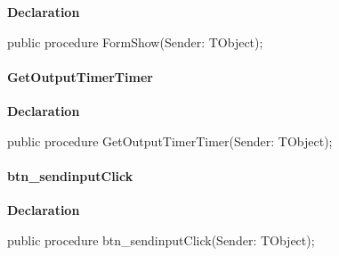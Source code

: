 \documentclass{report}
\newif\ifpdf
\begin{document}
\label{igobase.TIWizFrm-FormShow}
\begin{list}{}{
\setlength{\itemindent}{0cm}
\setlength{\listparindent}{0cm}
\setlength{\leftmargin}{\evensidemargin}
\addtolength{\leftmargin}{\tmplength}
\settowidth{\labelsep}{X}
\addtolength{\leftmargin}{\labelsep}
\setlength{\labelwidth}{\tmplength}
}
\item[\textbf{Declaration}\hfill]
\ifpdf
\begin{flushleft}
\fi
\begin{ttfamily}
public procedure FormShow(Sender: TObject);\end{ttfamily}

\ifpdf
\end{flushleft}
\fi

\end{list}
\paragraph*{GetOutputTimerTimer}\hspace*{\fill}

\label{igobase.TIWizFrm-GetOutputTimerTimer}
\begin{list}{}{
\setlength{\itemindent}{0cm}
\setlength{\listparindent}{0cm}
\setlength{\leftmargin}{\evensidemargin}
\addtolength{\leftmargin}{\tmplength}
\settowidth{\labelsep}{X}
\addtolength{\leftmargin}{\labelsep}
\setlength{\labelwidth}{\tmplength}
}
\item[\textbf{Declaration}\hfill]
\ifpdf
\begin{flushleft}
\fi
\begin{ttfamily}
public procedure GetOutputTimerTimer(Sender: TObject);\end{ttfamily}

\ifpdf
\end{flushleft}
\fi

\end{list}
\paragraph*{btn{\_}sendinputClick}\hspace*{\fill}

\label{igobase.TIWizFrm-btn_sendinputClick}
\begin{list}{}{
\setlength{\itemindent}{0cm}
\setlength{\listparindent}{0cm}
\setlength{\leftmargin}{\evensidemargin}
\addtolength{\leftmargin}{\tmplength}
\settowidth{\labelsep}{X}
\addtolength{\leftmargin}{\labelsep}
\setlength{\labelwidth}{\tmplength}
}
\item[\textbf{Declaration}\hfill]
\ifpdf
\begin{flushleft}
\fi
\begin{ttfamily}
public procedure btn{\_}sendinputClick(Sender: TObject);\end{ttfamily}

\ifpdf
\end{flushleft}
\fi

\end{list}
\end{document}
